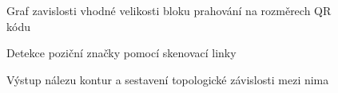 \begin{figure}[H]
  \begin{center}
    \caption{Graf zavislosti vhodné velikosti bloku prahování na rozměrech QR
    kódu}
    \label{DependencyOfSizeOfThresholdBlockToQRCodeSizes}
  \end{center}
\end{figure}

\begin{figure}[H]
  \begin{center}
    \caption{Detekce poziční značky pomocí skenovací linky}
    \label{QRCodeDetectionWithScanline}
  \end{center}
\end{figure}

\begin{figure}[H]
  \begin{center}
    \caption{Výstup nálezu kontur a sestavení topologické závislosti mezi nima}
    \label{ContourTopology}
  \end{center}
\end{figure}

